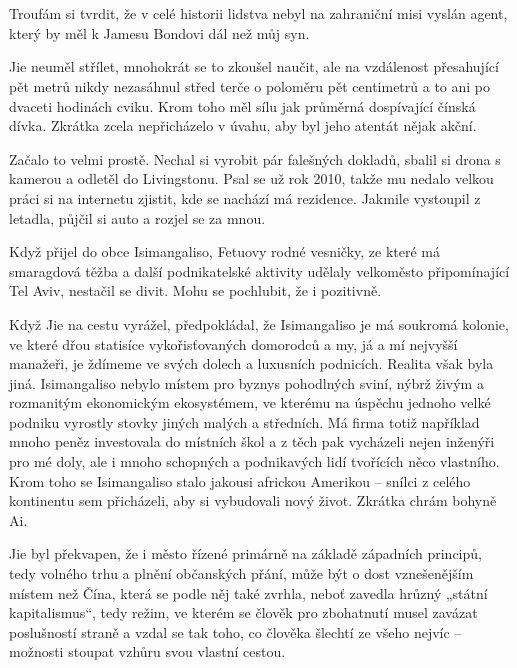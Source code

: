 \chapter{}

Troufám si tvrdit, že v celé historii lidstva nebyl na zahraniční misi vyslán agent, který by měl k Jamesu Bondovi dál než můj syn.

Jie neuměl střílet, mnohokrát se to zkoušel naučit, ale na vzdálenost přesahující pět metrů nikdy nezasáhnul střed terče o poloměru pět centimetrů a to ani po dvaceti hodinách cviku. Krom toho měl sílu jak průměrná dospívající čínská dívka. Zkrátka zcela nepřicházelo v úvahu, aby byl jeho atentát nějak akční. 

Začalo to velmi prostě. Nechal si vyrobit pár falešných dokladů, sbalil si drona s kamerou a odletěl do Livingstonu. Psal se už rok 2010, takže mu nedalo velkou práci si na internetu zjistit, kde se nachází má rezidence. Jakmile vystoupil z letadla, půjčil si auto a rozjel se za mnou.

Když přijel do obce Isimangaliso, Fetuovy rodné vesničky, ze které má smaragdová těžba a další podnikatelské aktivity udělaly velkoměsto připomínající Tel Aviv, nestačil se divit. Mohu se pochlubit, že i pozitivně.

Když Jie na cestu vyrážel, předpokládal, že Isimangaliso je má soukromá kolonie, ve které dřou statisíce vykořisťovaných domorodců a my, já a mí nejvyšší manažeři, je ždímeme ve svých dolech a luxusních podnicích. Realita však byla jiná. Isimangaliso nebylo místem pro byznys pohodlných sviní, nýbrž živým a rozmanitým ekonomickým ekosystémem, ve kterému na úspěchu jednoho velké podniku vyrostly stovky jiných malých a středních. Má firma totiž například mnoho peněz investovala do místních škol a z těch pak vycházeli nejen inženýři pro mé doly, ale i mnoho schopných a podnikavých lidí tvořících něco vlastního. Krom toho se Isimangaliso stalo jakousi africkou Amerikou – snílci z celého kontinentu sem přicházeli, aby si vybudovali nový život. Zkrátka chrám bohyně Ai.

Jie byl překvapen, že i město řízené primárně na základě západních principů, tedy volného trhu a plnění občanských přání, může být o dost vznešenějším místem než Čína, která se podle něj také zvrhla, neboť zavedla hrůzný „státní kapitalismus“, tedy režim, ve kterém se člověk pro zbohatnutí musel zavázat poslušností straně a vzdal se tak toho, co člověka šlechtí ze všeho nejvíc – možnosti stoupat vzhůru svou vlastní cestou.

